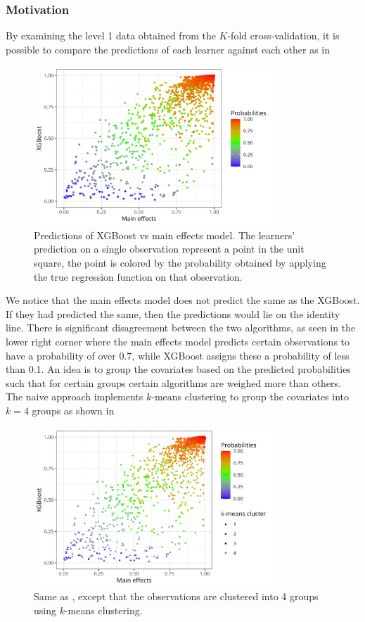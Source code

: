 \documentclass[./main.tex]{subfiles}
\begin{document}
\subsubsection{Motivation}
By examining the level 1 data obtained from the $ K $-fold cross-validation, it is possible to compare the predictions of each learner against each other as in 
\begin{figure}[H]
    \centering
    \includegraphics[width=0.8\textwidth]{figures/esl_preds_xgboost_vs_main.png}
    \caption{Predictions of XGBoost vs main effects model. The learners' prediction on a single observation represent a point in the unit square, the point is colored by the probability obtained by applying the true regression function on that observation.}
    \label{fig:esl_preds_xgboost_vs_main}
\end{figure}
We notice that the main effects model does not predict the same as the XGBoost. If they had predicted the same, then the predictions would lie on the identity line. There is significant disagreement between the two algorithms, as seen in the lower right corner where the main effects model predicts certain observations to have a probability of over 0.7, while XGBoost assigns these a probability of less than 0.1. An idea is to group the covariates based on the predicted probabilities such that for certain groups certain algorithms are weighed more than others. The naive approach implements $ k $-means clustering to group the covariates into $ k = 4 $ groups as shown in  
\begin{figure}[H]
    \centering
    \includegraphics[width=0.8\textwidth]{figures/esl_preds_xgboost_vs_main_kmeans.png}
\caption{Same as , except that the observations are clustered into 4 groups using $ k $-means clustering.}
    \label{fig:esl_preds_xgboost_vs_main_kmeans}
\end{figure}
\end{document}

